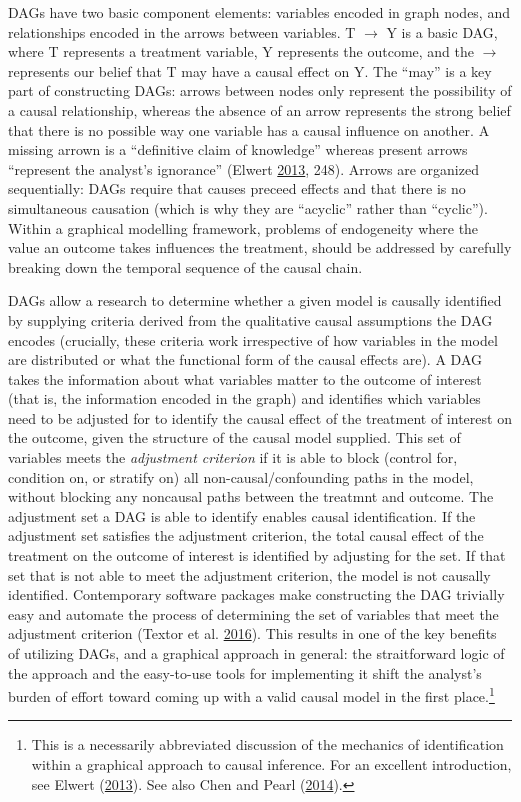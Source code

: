 \documentclass[11pt,]{book}
\begin{document}
DAGs have two basic component elements: variables encoded in graph nodes, and relationships encoded in the arrows between variables. T \(\rightarrow\) Y is a basic DAG, where T represents a treatment variable, Y represents the outcome, and the \(\rightarrow\) represents our belief that T may have a causal effect on Y. The ``may'' is a key part of constructing DAGs: arrows between nodes only represent the possibility of a causal relationship, whereas the absence of an arrow represents the strong belief that there is no possible way one variable has a causal influence on another. A missing arrown is a ``definitive claim of knowledge'' whereas present arrows ``represent the analyst's ignorance'' (Elwert \protect\hyperlink{ref-elwert_graphical_2013}{2013}, 248). Arrows are organized sequentially: DAGs require that causes preceed effects and that there is no simultaneous causation (which is why they are ``acyclic'' rather than ``cyclic''). Within a graphical modelling framework, problems of endogeneity where the value an outcome takes influences the treatment, should be addressed by carefully breaking down the temporal sequence of the causal chain.

DAGs allow a research to determine whether a given model is causally identified by supplying criteria derived from the qualitative causal assumptions the DAG encodes (crucially, these criteria work irrespective of how variables in the model are distributed or what the functional form of the causal effects are). A DAG takes the information about what variables matter to the outcome of interest (that is, the information encoded in the graph) and identifies which variables need to be adjusted for to identify the causal effect of the treatment of interest on the outcome, given the structure of the causal model supplied. This set of variables meets the \emph{adjustment criterion} if it is able to block (control for, condition on, or stratify on) all non-causal/confounding paths in the model, without blocking any noncausal paths between the treatmnt and outcome. The adjustment set a DAG is able to identify enables causal identification. If the adjustment set satisfies the adjustment criterion, the total causal effect of the treatment on the outcome of interest is identified by adjusting for the set. If that set that is not able to meet the adjustment criterion, the model is not causally identified. Contemporary software packages make constructing the DAG trivially easy and automate the process of determining the set of variables that meet the adjustment criterion (Textor et al. \protect\hyperlink{ref-textor_robust_2016}{2016}). This results in one of the key benefits of utilizing DAGs, and a graphical approach in general: the straitforward logic of the approach and the easy-to-use tools for implementing it shift the analyst's burden of effort toward coming up with a valid causal model in the first place.\footnote{This is a necessarily abbreviated discussion of the mechanics of identification within a graphical approach to causal inference. For an excellent introduction, see Elwert (\protect\hyperlink{ref-elwert_graphical_2013}{2013}). See also Chen and Pearl (\protect\hyperlink{ref-chen_graphical_2014}{2014}).}
\end{document}

